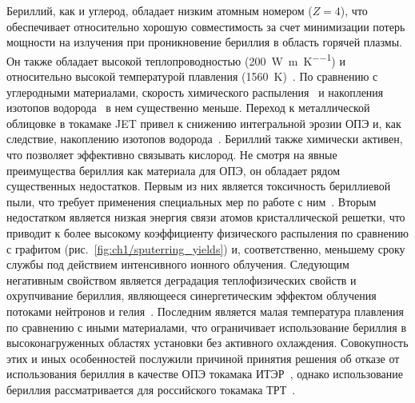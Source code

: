 Бериллий, как и углерод, обладает низким атомным номером ($Z=4$), что обеспечивает относительно хорошую совместимость за счет минимизации потерь мощности на излучения при проникновение бериллия в область горячей плазмы. Он также обладает высокой теплопроводностью (\SI{200}{\watt\per\meter\per\K}) и относительно высокой температурой плавления (\SI{1560}{\kelvin})~\cite{Ho1974}. По сравнению с углеродными материалами, скорость химического распыления~\cite{Brezinsek2014} и накопления изотопов водорода~\cite{DeTemmerman2021} в нем существенно меньше. Переход к металлической облицовке в токамаке JET привел к снижению интегральной эрозии ОПЭ и, как следствие, накоплению изотопов водорода~\cite{Brezinsek2015}. Бериллий также химически активен, что позволяет эффективно связывать кислород. Не смотря на явные преимущества бериллия как материала для ОПЭ, он обладает рядом существенных недостатков. Первым из них является токсичность бериллиевой пыли, что требует применения специальных мер по работе с ним~\cite{Strupp2011}. Вторым недостатком является низкая энергия связи атомов кристаллической решетки, что приводит к более высокому коэффициенту физического распыления по сравнению с графитом (рис.~\cref{fig:ch1/sputerring_yields}) и, соответственно, меньшему сроку службы под действием интенсивного ионного облучения. Следующим негативным свойством является деградация теплофизических свойств и охрупчивание бериллия, являющееся синергетическим эффектом облучения потоками нейтронов и гелия~\cite{Kesternich2003,Gilbert2012}. Последним является малая температура плавления по сравнению с иными материалами, что ограничивает использование бериллия в высоконагруженных областях установки без активного охлаждения. Совокупность этих и иных особенностей послужили причиной принятия решения об отказе от использования бериллия в качестве ОПЭ токамака ИТЭР~\cite{Barabaschi2025}, однако использование бериллия рассматривается для российского токамака ТРТ~\cite{Mazul2021,Piskarev2024}.

